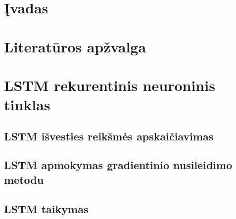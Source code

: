 \documentclass{ktu_phd_summary}
\begin{document}




\setcounter{page}{4}



\tableofcontents
\clearpage

\listoffigures
\clearpage


\section*{Įvadas}


\clearpage

\section{Literatūros apžvalga}


\clearpage



\section{LSTM rekurentinis neuroninis tinklas}




\subsection{LSTM išvesties reikšmės apskaičiavimas}


\subsection{LSTM apmokymas gradientinio nusileidimo metodu}


\subsection{LSTM taikymas}

\end{document}
